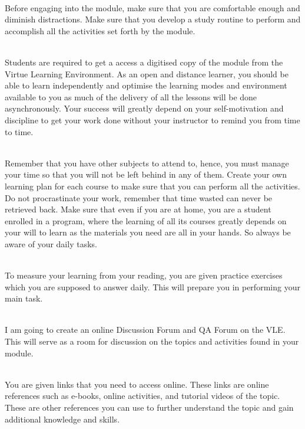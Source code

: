 \begin{description}[{format=\textcolor{ulabblue}}]
\item[STUDY ENVIRONMENT.]\leavevmode\\
Before engaging into the module, make sure that you are comfortable enough and diminish distractions. Make sure that you develop a study routine to perform and accomplish all the activities set forth by the module.

\item[MODE OF DELIVERY.]\leavevmode\\
Students are required to get a access a digitised copy of the module from the Virtue Learning Environment. As an open and distance learner, you should be able to learn independently and optimise the learning modes and environment available to you as much of  the delivery of all the lessons will be done asynchronously. Your success will greatly depend on your self-motivation and discipline to get your work done without your instructor to remind you from time to time.

\item[STUDY SCHEDULE.] \leavevmode\\
Remember that you have other subjects to attend to, hence, you must manage your time so that you will not be left behind in any of them. Create your own learning plan for each course to make sure that you can perform all the activities. Do not procrastinate your work, remember that time wasted can never be retrieved back. Make sure that even if you are at home, you are a student enrolled in a program, where the learning of all its courses greatly depends on your will to learn as the materials you need are all in your hands. So always be aware of your daily tasks.

\item[PRACTICE EXERCISE.]\leavevmode\\
To measure your learning from your reading, you are given practice exercises which you are supposed to answer daily. This will prepare you in performing your main task.

\item[ONLINE GROUP CHAT.]\leavevmode\\
I am going to create an online Discussion Forum and QA Forum  on the VLE.  This will serve as a room for discussion on the topics and activities found in your module.

\item[RECOMMENDED REFERENCES FOR SUPPLEMENTARY READING.]\leavevmode\\
You are given links that you need to access online. These links are online references such as e-books, online activities, and tutorial videos of the topic. These are other references you can use to further understand the topic and gain additional knowledge and skills.


\end{description}
